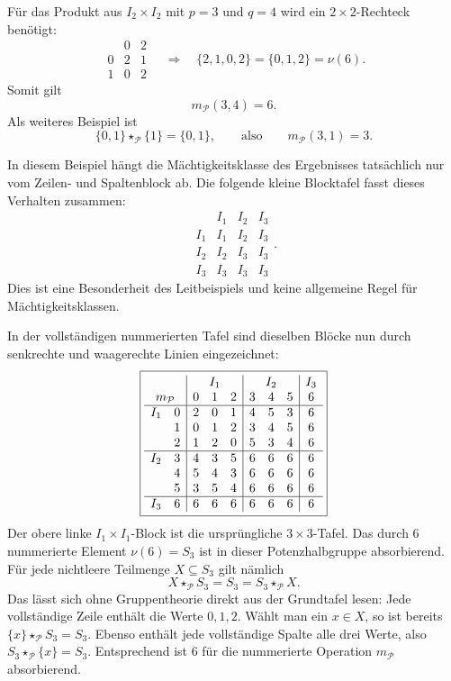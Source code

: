 \documentclass[main.tex]{subfiles}
\begin{document}
Für das Produkt aus \(I_2\times I_2\) mit \(p=3\) und \(q=4\) wird ein
\(2\times2\)-Rechteck benötigt:
\[
\begin{array}{c|cc}
&0&2\\\hline
0&2&1\\
1&0&2
\end{array}
\quad\Longrightarrow\quad
\{2,1,0,2\}=\{0,1,2\}=\nu(6).
\]
Somit gilt
\[
  m_{\mathcal P}(3,4)=6.
\]
Als weiteres Beispiel ist
\[
  \{0,1\}\star_{\mathcal P}\{1\}=\{0,1\},
  \qquad\text{also}\qquad
  m_{\mathcal P}(3,1)=3.
\]

In diesem Beispiel hängt die Mächtigkeitsklasse des Ergebnisses tatsächlich
nur vom Zeilen- und Spaltenblock ab.  Die folgende kleine Blocktafel fasst
dieses Verhalten zusammen:
\[
\begin{array}{c|ccc}
&I_1&I_2&I_3\\\hline
I_1&I_1&I_2&I_3\\
I_2&I_2&I_3&I_3\\
I_3&I_3&I_3&I_3
\end{array}.
\]
Dies ist eine Besonderheit des Leitbeispiels und keine allgemeine Regel für
Mächtigkeitsklassen.

In der vollständigen nummerierten Tafel sind dieselben Blöcke nun durch
senkrechte und waagerechte Linien eingezeichnet:
\[
\boxed{
\begin{array}{cc|ccc|ccc|c}
\multicolumn{2}{c|}{}
  &\multicolumn{3}{c|}{I_1}
  &\multicolumn{3}{c|}{I_2}
  &\multicolumn{1}{c}{I_3}\\
\multicolumn{2}{c|}{m_{\mathcal P}}
  &0&1&2&3&4&5&6\\\hline
I_1&0&2&0&1&4&5&3&6\\
   &1&0&1&2&3&4&5&6\\
   &2&1&2&0&5&3&4&6\\\hline
I_2&3&4&3&5&6&6&6&6\\
   &4&5&4&3&6&6&6&6\\
   &5&3&5&4&6&6&6&6\\\hline
I_3&6&6&6&6&6&6&6&6
\end{array}}
\]
Der obere linke \(I_1\times I_1\)-Block ist die ursprüngliche
\(3\times3\)-Tafel.  Das durch \(6\) nummerierte Element
\(\nu(6)=S_3\) ist in dieser Potenzhalbgruppe absorbierend.  Für jede
nichtleere Teilmenge \(X\subseteq S_3\) gilt nämlich
\[
  X\star_{\mathcal P}S_3
  =
  S_3
  =
  S_3\star_{\mathcal P}X.
\]
Das lässt sich ohne Gruppentheorie direkt aus der Grundtafel lesen: Jede
vollständige Zeile enthält die Werte \(0,1,2\).  Wählt man ein
\(x\in X\), so ist bereits
\(\{x\}\star_{\mathcal P}S_3=S_3\).  Ebenso enthält jede vollständige
Spalte alle drei Werte, also
\(S_3\star_{\mathcal P}\{x\}=S_3\).
Entsprechend ist \(6\) für die nummerierte Operation \(m_{\mathcal P}\)
absorbierend.
\end{document}

